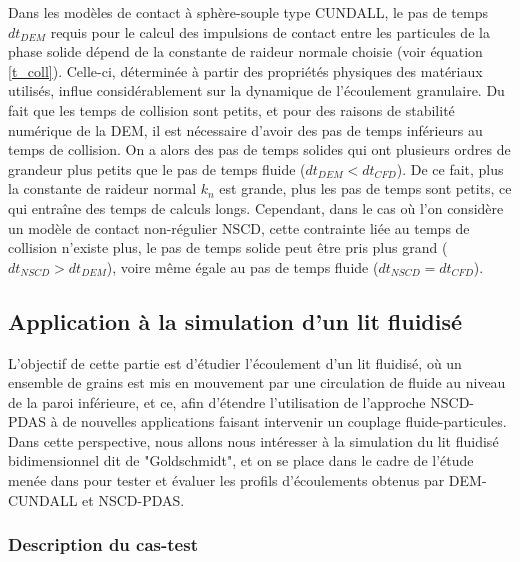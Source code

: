 Dans les modèles de contact à sphère-souple type CUNDALL, le pas de temps $dt_{DEM}$ requis pour le calcul des impulsions de contact entre les particules de la phase solide dépend de la constante de raideur normale choisie (voir équation \ref{t_coll}). Celle-ci, déterminée à partir des propriétés physiques des matériaux utilisés, influe considérablement sur la dynamique de l'écoulement granulaire. Du fait que les temps de collision sont petits, et pour des raisons de stabilité numérique de la DEM, il est nécessaire d'avoir des pas de temps inférieurs au temps de collision. On a alors des pas de temps solides qui ont plusieurs ordres de grandeur plus petits que le pas de temps fluide ($dt_{DEM}<dt_{CFD}$). De ce fait, plus la constante de raideur normal $k_n$ est grande, plus les pas de temps sont petits, ce qui entraîne des temps de calculs longs. Cependant, dans le cas où l'on  considère un modèle de contact non-régulier NSCD, cette contrainte liée au temps de collision n'existe plus, le pas de temps solide peut être pris plus grand ($dt_{NSCD}>dt_{DEM}$), voire même égale au pas de temps fluide ($dt_{NSCD}=dt_{CFD}$).

\subsection{Application à la simulation d'un lit fluidisé}

L'objectif de cette partie est d'étudier l'écoulement d'un lit fluidisé, où un ensemble de grains est mis en mouvement par une circulation de fluide au niveau de la paroi inférieure, et ce, afin d'étendre l'utilisation de l'approche NSCD-PDAS à de nouvelles applications faisant intervenir un couplage fluide-particules. Dans cette perspective, nous allons nous intéresser à la simulation du lit fluidisé bidimensionnel dit de "Goldschmidt", et on se place dans le cadre de l'étude menée dans \cite{goldschmidt2004hydrodynamic} pour tester et évaluer les profils d'écoulements obtenus par DEM-CUNDALL et NSCD-PDAS.

\subsubsection{Description du cas-test}


